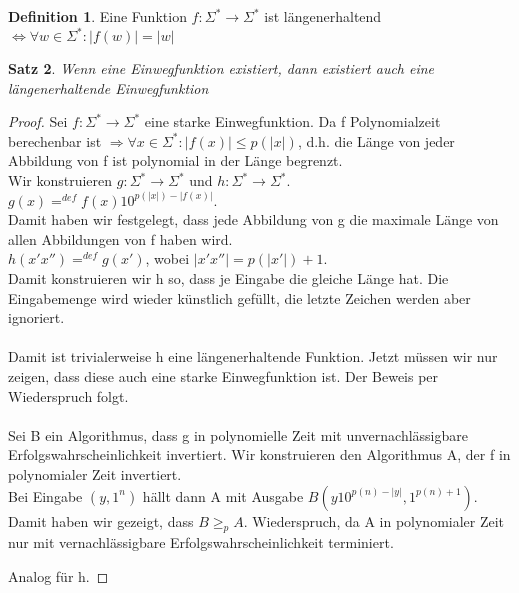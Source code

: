 \documentclass[12pt,a4paper]{article}
\newtheorem{theorem}{Satz}[section]
\theoremstyle{definition}
\newtheorem{definition}[theorem]{Definition}
\begin{document}
    \begin{definition}
        Eine Funktion $f: \Sigma^* \longrightarrow \Sigma^*$ ist
        längenerhaltend $\Leftrightarrow \forall w \in \Sigma^{*}: |f(w)| = |w|$
    \end{definition}
    \begin{theorem}
        Wenn eine Einwegfunktion existiert, dann existiert auch eine längenerhaltende Einwegfunktion
    \end{theorem}
    \begin{proof}
        Sei $f: \Sigma^* \longrightarrow \Sigma^*$ eine starke Einwegfunktion.
        Da f Polynomialzeit berechenbar ist $\Rightarrow \forall x \in \Sigma^*: |f(x)| \leq p(|x|)$, d.h. die
        Länge von jeder Abbildung von f ist polynomial in der Länge begrenzt. \\
        Wir konstruieren $g: \Sigma^* \longrightarrow \Sigma^*$ und $h: \Sigma^* \longrightarrow \Sigma^*$. \\
        $g(x) =^{def} f(x)10^{p(|x|) - |f(x)|}$. \\
        Damit haben wir festgelegt, dass jede Abbildung von g die maximale
        Länge von allen Abbildungen von f haben wird. \\
        $h(x'x'') =^{def} g(x')$, wobei $|x'x''| = p(|x'|) + 1$. \\
        Damit konstruieren wir h so, dass je Eingabe die gleiche
        Länge hat. Die Eingabemenge wird wieder künstlich gefüllt, die letzte Zeichen werden aber ignoriert. \\ \\

        Damit ist trivialerweise h eine längenerhaltende Funktion. Jetzt müssen wir nur zeigen, dass diese auch
        eine starke Einwegfunktion ist. Der Beweis per Wiederspruch folgt.\\ \\
        Sei B ein Algorithmus, dass g in polynomielle Zeit mit unvernachlässigbare Erfolgswahrscheinlichkeit invertiert.
        Wir konstruieren den Algorithmus A, der f in polynomialer Zeit invertiert. \\
        Bei Eingabe $(y, 1^n)$ hällt dann A mit Ausgabe $B(y10^{p(n) - |y|}, 1^{p(n) + 1})$. \\
        Damit haben wir gezeigt, dass $B \geq_p A$. Wiederspruch, da A in polynomialer Zeit nur mit vernachlässigbare
        Erfolgswahrscheinlichkeit terminiert.

        Analog für h.
    \end{proof}
\end{document}

